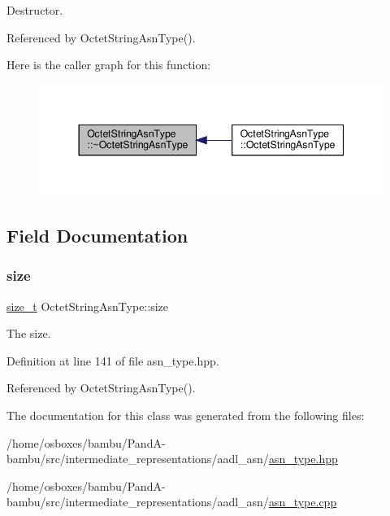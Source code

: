 Destructor. 



Referenced by Octet\+String\+Asn\+Type().

Here is the caller graph for this function\+:
\nopagebreak
\begin{figure}[H]
\begin{center}
\leavevmode
\includegraphics[width=344pt]{d2/d9f/classOctetStringAsnType_a48c66e843c1be6a0ad03e4d558e4381d_icgraph}
\end{center}
\end{figure}


\subsection{Field Documentation}
\mbox{\label{classOctetStringAsnType_a854cbefd2a15457fc837377dacc59194}} 
\subsubsection{\texorpdfstring{size}{size}}
{\footnotesize\ttfamily \hyperlink{tutorial__fpt__2017_2intro_2sixth_2test_8c_a7c94ea6f8948649f8d181ae55911eeaf}{size\+\_\+t} Octet\+String\+Asn\+Type\+::size}



The size. 



Definition at line 141 of file asn\+\_\+type.\+hpp.



Referenced by Octet\+String\+Asn\+Type().



The documentation for this class was generated from the following files\+:\begin{DoxyCompactItemize}
\item 
/home/osboxes/bambu/\+Pand\+A-\/bambu/src/intermediate\+\_\+representations/aadl\+\_\+asn/\hyperlink{asn__type_8hpp}{asn\+\_\+type.\+hpp}\item 
/home/osboxes/bambu/\+Pand\+A-\/bambu/src/intermediate\+\_\+representations/aadl\+\_\+asn/\hyperlink{asn__type_8cpp}{asn\+\_\+type.\+cpp}\end{DoxyCompactItemize}
